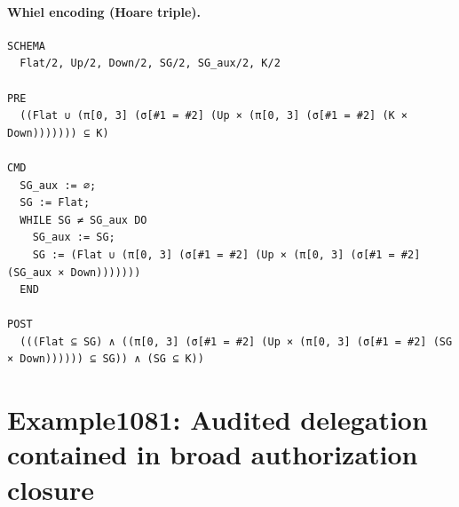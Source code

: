 \documentclass[10pt]{article}
\begin{document}
\paragraph{Whiel encoding (Hoare triple).}

\begin{Verbatim}[fontsize=\scriptsize,breaklines=true,breakanywhere=true,frame=single,framesep=1.5mm]
SCHEMA
  Flat/2, Up/2, Down/2, SG/2, SG_aux/2, K/2

PRE
  ((Flat ∪ (π[0, 3] (σ[#1 = #2] (Up × (π[0, 3] (σ[#1 = #2] (K × Down))))))) ⊆ K)

CMD
  SG_aux := ∅;
  SG := Flat;
  WHILE SG ≠ SG_aux DO
    SG_aux := SG;
    SG := (Flat ∪ (π[0, 3] (σ[#1 = #2] (Up × (π[0, 3] (σ[#1 = #2] (SG_aux × Down)))))))
  END

POST
  (((Flat ⊆ SG) ∧ ((π[0, 3] (σ[#1 = #2] (Up × (π[0, 3] (σ[#1 = #2] (SG × Down)))))) ⊆ SG)) ∧ (SG ⊆ K))
\end{Verbatim}

\Needspace{0.45\textheight}

\section{Example1081: Audited delegation contained in broad authorization closure}\label{case:Example1081}
\end{document}
